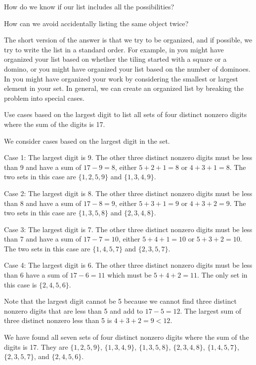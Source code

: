 \begin{bull}
    \item How do we know if our list includes all the possibilities? 
    \item How can we avoid accidentally listing the same object twice? 
\end{bull}

The short version of the answer is that we try to be organized, and if possible, we try to write the list in a standard order. For example, in  you might have organized your list based on whether the tiling started with a square or a domino, or you might have organized your list based on the number of dominoes. In  you might have organized your work by considering the smallest or largest element in your set. In general, we can create an organized list by breaking the problem into special cases.

\begin{exam}
\label{exam_kakuro_12in4}
    Use cases based on the largest digit to list all sets of four distinct nonzero digits where the sum of the digits is 17.
        \begin{soln}
            We consider cases based on the largest digit in the set.  

            Case 1: The largest digit is 9.
            The other three distinct nonzero digits must be less than 9 and have a sum of $17-9=8$, either $5+2+1 = 8$ or $4+3+1=8$.  The two sets in this case are $\{1,2,5,9\}$ and $\{1,3,4,9\}$.

            Case 2: The largest digit is 8.  
            The other three distinct nonzero digits must be less than 8 and have a sum of $17-8=9$, either $5+3+1 = 9$ or $4+3+2=9$.  The two sets in this case are $\{1,3,5,8\}$ and $\{2,3,4,8\}$.

            Case 3: The largest digit is 7.
            The other three distinct nonzero digits must be less than 7 and have a sum of $17-7=10$, either $5+4+1 = 10$ or $5+3+2=10$. The two sets in this case are $\{1,4,5,7\}$ and $\{2,3,5,7\}$.

            Case 4: The largest digit is 6.
            The other three distinct nonzero digits must be less than 6 have a sum of $17-6=11$ which must be $5+4+2 = 11$.  The only set in this case is $\{2,4,5,6\}$.

            Note that the largest digit cannot be 5 because we cannot find three distinct nonzero digits that are less than 5 and add to $17-5=12$.  The largest sum of three distinct nonzero less than 5 is $4+3+2=9<12$.

            We have found all seven sets of four distinct nonzero digits where the sum of the digits is 17.  They are 
                $\{1,2,5,9\}$, 
                $\{1,3,4,9\}$, 
                $\{1,3,5,8\}$, 
                $\{2,3,4,8\}$, 
                $\{1,4,5,7\}$, 
                $\{2,3,5,7\}$, and 
                $\{2,4,5,6\}$.
        \end{soln}   
\end{exam}

